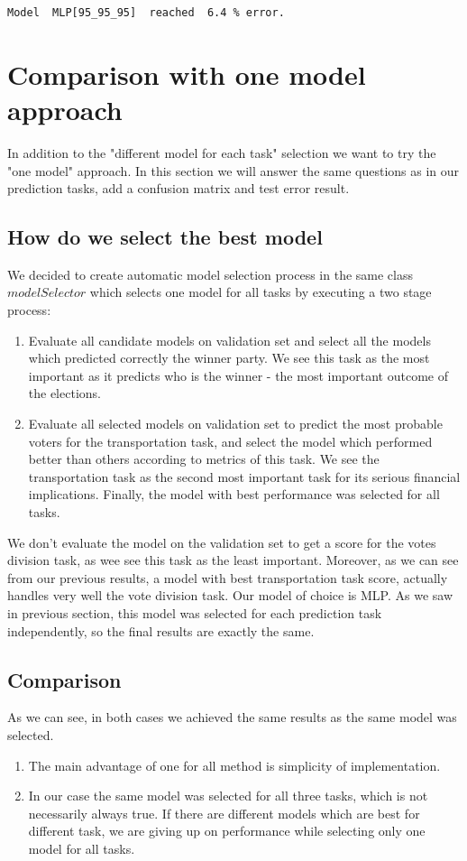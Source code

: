 \documentclass[12pt]{article}
\begin{document}
\begin{verbatim}
Model  MLP[95_95_95]  reached  6.4 % error.
\end{verbatim}

\newpage
\section{Comparison with one model approach}
In addition to the "different model for each task" selection we want to try the "one model" approach. In this section we will answer the same questions as in our prediction tasks, add a confusion matrix and test error result.
\subsection{How do we select the best model}
We decided to create automatic model selection process in the same class $modelSelector$ which selects one model for all tasks by executing a two stage process:
\begin{enumerate}
\item Evaluate all candidate models on validation set and select all the models which predicted correctly the winner party. We see this task as the most important as it predicts who is the winner - the most important outcome of the elections.
\item Evaluate all selected models on validation set to predict the most probable voters for the transportation task, and select the model which performed better than others according to metrics of this task. We see the transportation task as the second most important task for its serious financial implications. Finally, the model with best performance was selected for all tasks. 
\end{enumerate}
We don't evaluate the model on the validation set to get a score for the votes division task, as wee see this task as the least important. Moreover, as we can see from our previous results, a model with best transportation task score, actually handles very well the vote division task. Our model of choice is MLP. As we saw in previous section, this model was selected for each prediction task independently, so the final results are exactly the same.  

\subsection{Comparison}
As we can see, in both cases we achieved the same results as the same model was selected.
\begin{enumerate}
\item The main advantage of one for all method is simplicity of implementation.
\item In our case the same model was selected for all three tasks, which is not necessarily always true. If there are different models which are best for different task, we are giving up on performance while selecting only one model for all tasks.
\end{enumerate}
\end{document}

